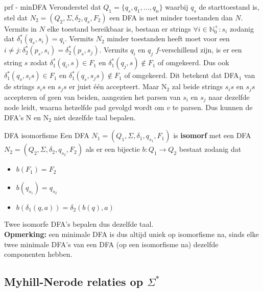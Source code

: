 \begin{prf}{prf - minDFA}
    Veronderstel dat \(Q_1 = \{q_s,q_1, \ldots, q_n\}\) waarbij \(q_s\) de starttoestand is, stel dat \(N_2 = (Q_2,\Sigma, \delta_2, q_s, F_2)\) een DFA is met minder toestanden dan $N$.
    Vermits in $N$ elke toestand bereikbaar is, bestaan er strings \(\forall i \in \mathbb{N}_0^+: s_i\) zodanig dat \(\delta_1^*(q_s,s_i) = q_i\). 
    Vermits \(N_2\) minder toestanden heeft moet voor een \(i \neq j: \delta_2^*(p_s,s_i) = \delta_2^*(p_s,s_j)\). Vermits \(q_i\) en \(q_j\)
    $f$-verschillend zijn, is er een string \(s\) zodat \(\delta_1^*(q_i,s) \in F_1\) en \(\delta_1^*(q_j,s) \notin F_1\) of omgekeerd.
    Dus ook \(\delta_1^*(q_s,s_is) \in F_1\) en \(\delta_1^*(q_s,s_js) \notin F_1\) of omgekeerd. Dit betekent dat DFA$_1$ van de strings $s_is$ en $s_js$ er juist één accepteert.
    Maar N$_2$ zal beide strings $s_is$ en $s_js$ accepteren of geen van beiden, aangezien het parsen van $s_i$ en $s_j$ naar dezelfde node leidt, waarna hetzelfde pad gevolgd wordt om $v$ te parsen.
    Dus kunnen de DFA's N en N$_2$ niet dezelfde taal bepalen.
    \vspace{-0.3cm}
\end{prf}

\begin{theo}{DFA isomorfisme}
    Een DFA $N_1 = (Q_1, \Sigma, \delta_1, q_{s_1}, F_1)$ is \textbf{isomorf} met een DFA $N_2 = (Q_2, \Sigma, \delta_2, q_{s_2}, F_2)$ als er een bijectie $b: Q_1 \to Q_2$ bestaat zodanig dat
    \begin{itemize}
        \item $b(F_1) = F_2$
        \item $b(q_{s_1}) = q_{s_2}$
        \item $b(\delta_1(q,a)) = \delta_2(b(q),a)$
    \end{itemize}
    Twee isomorfe DFA's bepalen dus dezelfde taal. \\

    \textbf{Opmerking:} een minimale DFA is dus altijd uniek op isomorfisme na, sinds elke twee minimale DFA's van een DFA (op een isomorfisme na) dezelfde componenten hebben.
\end{theo}

\newpage

\subsection{Myhill-Nerode relaties op $\Sigma^*$}

